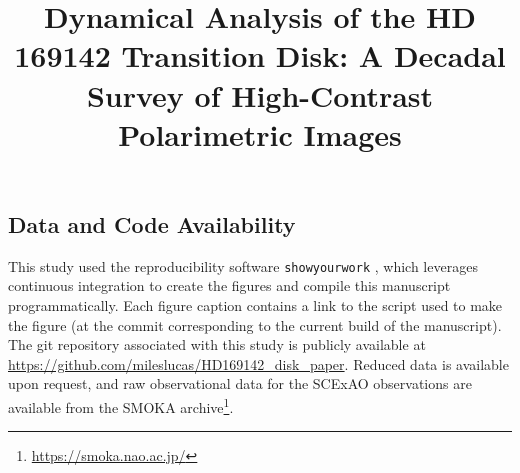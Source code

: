 \documentclass[twocolumn,twocolappendix]{aastex631}
\begin{document}
\begin{CJK*}{UTF8}{gbsn}

\title{Dynamical Analysis of the HD 169142 Transition Disk: A Decadal Survey of High-Contrast Polarimetric Images}



\begin{abstract}
\end{abstract}












\appendix




\section{Data and Code Availability}
This study used the reproducibility software \texttt{showyourwork} \citep{luger_mapping_2021}, which leverages continuous integration to create the figures and compile this manuscript programmatically. Each figure caption contains a link to the script used to make the figure (at the commit corresponding to the current build of the manuscript). The git repository associated with this study is publicly available at \url{https://github.com/mileslucas/HD169142_disk_paper}. Reduced data is available upon request, and raw observational data for the SCExAO observations are available from the SMOKA archive\footnote{\url{https://smoka.nao.ac.jp/}}.


\end{CJK*}
\end{document}
